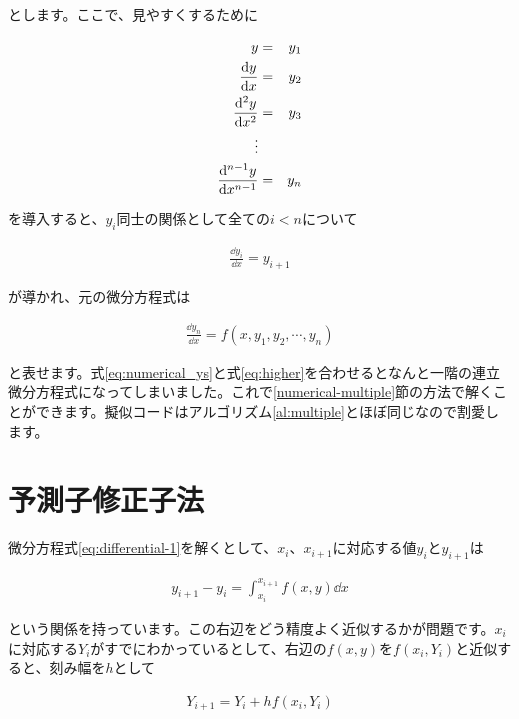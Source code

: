 \noindent
とします。ここで、見やすくするために

\begin{eqnarray}
    y&=&y_1 \nonumber \\
    \frac{\dd y}{\dd x}&=&y_2 \nonumber \\
    \frac{\dd^2 y}{\dd x^2}&=&y_3 \nonumber \\
    \vdots \nonumber \\
    \frac{\dd^{n-1} y}{\dd x^{n-1}}&=&y_n \setcounter{equation}{35}
\end{eqnarray}

\noindent
を導入すると、$y_i$同士の関係として全ての$i<n$について

\begin{eqnarray}
    \frac{\dd y_i}{\dd x}=y_{i+1}
    \label{eq:numerical_ys}
\end{eqnarray}

\noindent
が導かれ、元の微分方程式は

\begin{eqnarray}
    \frac{\dd y_n}{\dd x}=f(x,y_1,y_2,\cdots,y_n)
    \label{eq:higher}
\end{eqnarray}

\noindent
と表せます。式\ref{eq:numerical_ys}と式\ref{eq:higher}を合わせるとなんと一階の連立微分方程式になってしまいました。これで\ref{numerical-multiple}節の方法で解くことができます。擬似コードはアルゴリズム\ref{al:multiple}とほぼ同じなので割愛します。








\section{予測子修正子法}
\label{numerical-integrate}
微分方程式\ref{eq:differential-1}を解くとして、$x_i$、$x_{i+1}$に対応する値$y_i$と$y_{i+1}$は

\begin{eqnarray}
    y_{i+1}-y_i=\int_{x_i}^{x_{i+1}}f(x,y)\dd x
    \label{eq:numerical-integrate}
\end{eqnarray}

\noindent
という関係を持っています。この右辺をどう精度よく近似するかが問題です。$x_i$に対応する$Y_i$がすでにわかっているとして、右辺の$f(x,y)$を$f(x_i,Y_i)$と近似すると、刻み幅を$h$として

\begin{eqnarray}
    Y_{i+1}=Y_i+hf(x_i,Y_i) \nonumber
\end{eqnarray}

